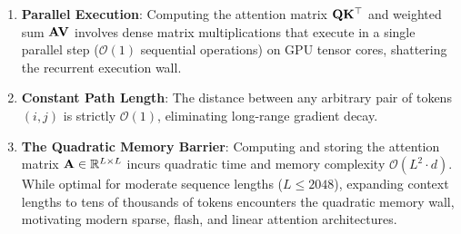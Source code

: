 \documentclass[../../main.tex]{subfiles}
\begin{document}
\begin{enumerate}
    \item \textbf{Parallel Execution}: Computing the attention matrix $\mathbf{Q} \mathbf{K}^\top$ and weighted sum $\mathbf{A} \mathbf{V}$ involves dense matrix multiplications that execute in a single parallel step ($\mathcal{O}(1)$ sequential operations) on GPU tensor cores, shattering the recurrent execution wall.
    \item \textbf{Constant Path Length}: The distance between any arbitrary pair of tokens $(i, j)$ is strictly $\mathcal{O}(1)$, eliminating long-range gradient decay.
    \item \textbf{The Quadratic Memory Barrier}: Computing and storing the attention matrix $\mathbf{A} \in \mathbb{R}^{L \times L}$ incurs quadratic time and memory complexity $\mathcal{O}(L^2 \cdot d)$. While optimal for moderate sequence lengths ($L \le 2048$), expanding context lengths to tens of thousands of tokens encounters the quadratic memory wall, motivating modern sparse, flash, and linear attention architectures.
\end{enumerate}

\clearpage
\thispagestyle{empty}
\null
\clearpage
\end{document}
